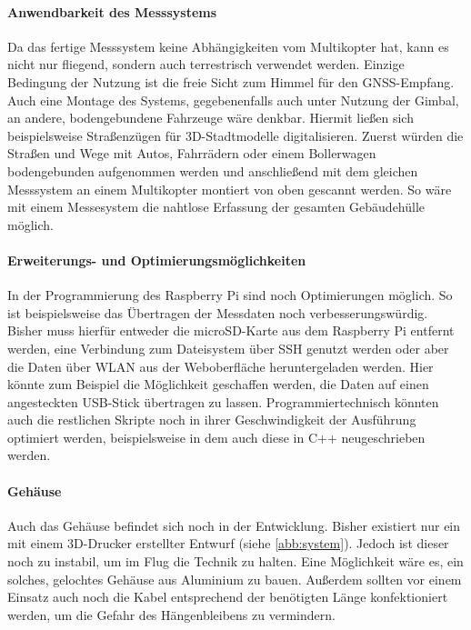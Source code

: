 \documentclass[a4paper,12pt,bibliography=totoc, listof=totoc,titlepage,pointlessnumbers]{scrreprt}
\begin{document}
\paragraph{Anwendbarkeit des Messsystems}
Da das fertige Messsystem keine Abhängigkeiten vom Multikopter hat, kann es nicht nur fliegend, sondern auch terrestrisch verwendet werden. Einzige Bedingung der Nutzung ist die freie Sicht zum Himmel für den GNSS-Empfang. Auch eine Montage des Systems, gegebenenfalls auch unter Nutzung der Gimbal, an andere, bodengebundene Fahrzeuge wäre denkbar. Hiermit ließen sich beispielsweise Straßenzügen für 3D-Stadtmodelle digitalisieren. Zuerst würden die Straßen und Wege mit Autos, Fahrrädern oder einem Bollerwagen bodengebunden aufgenommen werden und anschließend mit dem gleichen Messsystem an einem Multikopter montiert von oben gescannt werden. So wäre mit einem Messesystem die nahtlose Erfassung der gesamten Gebäudehülle möglich.

\paragraph{Erweiterungs- und Optimierungsmöglichkeiten}
In der Programmierung des Rasp\-berry Pi sind noch Optimierungen möglich. So ist beispielsweise das Übertragen der Messdaten noch verbesserungswürdig. Bisher muss hierfür entweder die microSD-Karte aus dem Rasp\-berry Pi entfernt werden, eine Verbindung zum Dateisystem über SSH genutzt werden oder aber die Daten über WLAN aus der Weboberfläche heruntergeladen werden. Hier könnte zum Beispiel die Möglichkeit geschaffen werden, die Daten auf einen angesteckten USB-Stick übertragen zu lassen. Programmiertechnisch könnten auch die restlichen Skripte noch in ihrer Geschwindigkeit der Ausführung optimiert werden, beispielsweise in dem auch diese in C++ neugeschrieben werden.

\paragraph{Gehäuse}
Auch das Gehäuse befindet sich noch in der Entwicklung. Bisher existiert nur ein mit einem 3D-Drucker erstellter Entwurf (siehe \autoref{abb:system}). Jedoch ist dieser noch zu instabil, um im Flug die Technik zu halten. Eine Möglichkeit wäre es, ein solches, gelochtes Gehäuse aus Aluminium zu bauen. Außerdem sollten vor einem Einsatz auch noch die Kabel entsprechend der benötigten Länge konfektioniert werden, um die Gefahr des Hängenbleibens zu vermindern.
\end{document}
